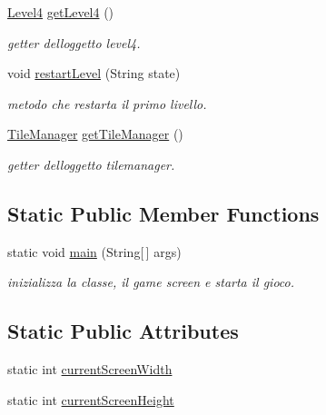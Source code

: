 \begin{DoxyCompactItemize}
\hyperlink{classscenes_1_1_level4}{Level4} \hyperlink{classprogetto_1_1_game_a09e02ae6992f3328be34c9062ef142f8}{get\+Level4} ()
\begin{DoxyCompactList}\small\item\em getter dell\textquotesingle{}oggetto level4. \end{DoxyCompactList}\item 
void \hyperlink{classprogetto_1_1_game_a822df2119249080840a3149d454807d5}{restart\+Level} (String state)
\begin{DoxyCompactList}\small\item\em metodo che restarta il primo livello. \end{DoxyCompactList}\item 
\hyperlink{classmanagers_1_1_tile_manager}{Tile\+Manager} \hyperlink{classprogetto_1_1_game_ad519f2a339c804d206a38ecd2c33f667}{get\+Tile\+Manager} ()
\begin{DoxyCompactList}\small\item\em getter dell\textquotesingle{}oggetto tilemanager. \end{DoxyCompactList}\end{DoxyCompactItemize}
\subsection*{Static Public Member Functions}
\begin{DoxyCompactItemize}
\item 
static void \hyperlink{classprogetto_1_1_game_a8b260eecbaabcef8473fd87ada040682}{main} (String\mbox{[}$\,$\mbox{]} args)
\begin{DoxyCompactList}\small\item\em inizializza la classe, il game screen e starta il gioco. \end{DoxyCompactList}\end{DoxyCompactItemize}
\subsection*{Static Public Attributes}
\begin{DoxyCompactItemize}
\item 
static int \hyperlink{classprogetto_1_1_game_ae5534d1409141e465b0aa92dfce9bf9c}{current\+Screen\+Width}
\item 
static int \hyperlink{classprogetto_1_1_game_a1aca3161d2e02e5dc13bb3cae83a8ad1}{current\+Screen\+Height}
\end{DoxyCompactItemize}
